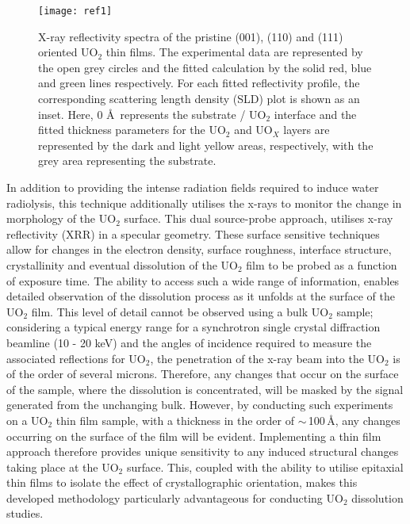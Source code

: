 \documentclass[twocolumn,prl,nobalancelastpage,aps,10pt]{revtex4-1}
\begin{document}
\begin{figure}
	\centering
	\texttt{[image: ref1]}
	\caption{X-ray reflectivity spectra of the pristine (001), (110) and (111) oriented UO$_2$ thin films. The experimental data are represented by the open grey circles and the fitted calculation by the solid red, blue and green lines respectively. For each fitted reflectivity profile, the corresponding scattering length density (SLD) plot is shown as an inset. Here, 0 \AA\, represents the substrate / UO$_2$ interface and the fitted thickness parameters for the UO$_2$ and UO$_X$ layers are represented by the dark and light yellow areas, respectively, with the grey area representing the substrate.}
	\label{fig:pristinexrr111}
\end{figure}

In addition to providing the intense radiation fields required to induce water radiolysis, this technique additionally utilises the x-rays to monitor the change in morphology of the UO$_2$ surface.  This dual source-probe approach, utilises x-ray reflectivity (XRR) in a specular geometry. These surface sensitive techniques allow for changes in the electron density, surface roughness, interface structure, crystallinity and eventual dissolution of the UO$_2$ film to be probed as a function of exposure time. The ability to access such a wide range of information, enables detailed observation of the dissolution process as it unfolds at the surface of the UO$_2$ film. This level of detail cannot be observed using a bulk UO$_2$ sample; considering a typical energy range for a synchrotron single crystal diffraction beamline (10 - 20 keV) and the angles of incidence required to measure the associated reflections for UO$_2$, the penetration of the x-ray beam into the UO$_2$ is of the order of several microns. Therefore, any changes that occur on the surface of the sample, where the dissolution is concentrated, will be masked by the signal generated from the unchanging bulk. However, by conducting such experiments on a UO$_2$ thin film sample, with a thickness in the order of $\sim$\,100\,\AA, any changes occurring on the surface of the film will be evident. Implementing a thin film approach therefore provides unique sensitivity to any induced structural changes taking place at the UO$_2$ surface. This, coupled with the ability to utilise epitaxial thin films to isolate the effect of crystallographic orientation, makes this developed methodology particularly advantageous for conducting UO$_2$ dissolution studies.
\end{document}
